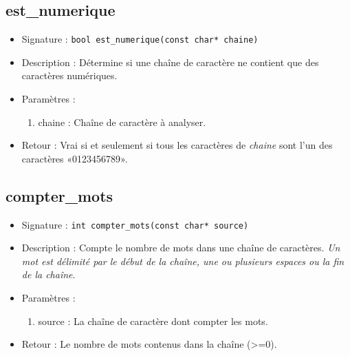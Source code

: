 \documentclass[12pt,pdftex,oneside]{article}
\begin{document}
\subsection{est\_numerique}
\begin{itemize}
\item Signature : \texttt{bool est\_numerique(const char* chaine)}
\item Description : Détermine si une chaîne de caractère ne contient que des caractères numériques.
\item Paramètres :
  \begin{enumerate}
  \item chaine : Chaîne de caractère à analyser.
  \end{enumerate}
  \item Retour : Vrai si et seulement si tous les caractères de \emph{chaine} sont l'un des caractères «0123456789».
\end{itemize}


\subsection{compter\_mots}
\begin{itemize}
\item Signature : \texttt{int compter\_mots(const char* source)}
\item Description : Compte le nombre de mots dans une chaîne de caractères. \emph{Un mot est délimité par le début de la chaîne, une ou plusieurs espaces ou la fin de la chaîne}.
\item Paramètres :
  \begin{enumerate}
  \item source : La chaîne de caractère dont compter les mots.
  \end{enumerate}
\item Retour : Le nombre de mots contenus dans la chaîne (>=0).
\end{itemize}
\end{document}
